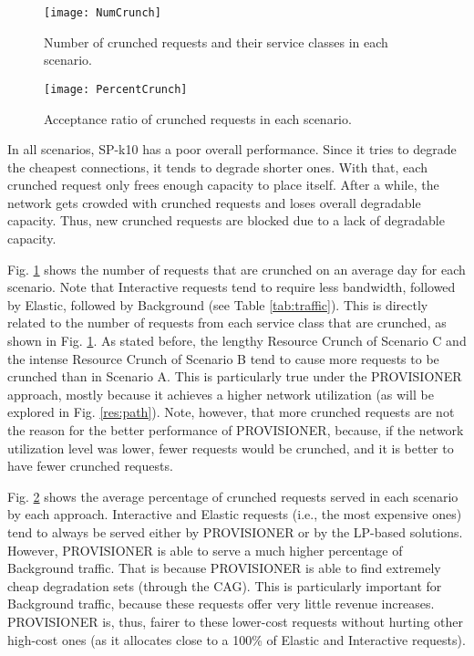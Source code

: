 \documentclass[journal]{IEEEtran}
\begin{document}
\begin{figure}[!t] 
 \centering
 \texttt{[image: NumCrunch]} 
 \caption{Number of crunched requests and their service classes in each scenario.}
 \label{res:num_crunch} 
\end{figure}

\begin{figure}[!t] 
 \centering
 \texttt{[image: PercentCrunch]} 
 \caption{Acceptance ratio of crunched requests in each scenario.}
 \label{res:percent_crunch} 
\end{figure}

In all scenarios, SP-k10 has a poor overall performance. Since it tries to degrade the cheapest connections, it tends to degrade shorter ones. With that, each crunched request only frees enough capacity to place itself. After a while, the network gets crowded with crunched requests and loses overall degradable capacity. Thus, new crunched requests are blocked due to a lack of degradable capacity.

Fig. \ref{res:num_crunch} shows the number of requests that are crunched on an average day for each scenario. Note that Interactive requests tend to require less bandwidth, followed by Elastic, followed by Background (see Table \ref{tab:traffic}). This is directly related to the number of requests from each service class that are crunched, as shown in Fig. \ref{res:num_crunch}. As stated before, the lengthy Resource Crunch of Scenario C and the intense Resource Crunch of Scenario B tend to cause more requests to be crunched than in Scenario A. This is particularly true under the PROVISIONER approach, mostly because it achieves a higher network utilization (as will be explored in Fig. \ref{res:path}). Note, however, that more crunched requests are not the reason for the better performance of PROVISIONER, because, if the network utilization level was lower, fewer requests would be crunched, and it is better to have fewer crunched requests.

Fig. \ref{res:percent_crunch} shows the average percentage of crunched requests served in each scenario by each approach. Interactive and Elastic requests (i.e., the most expensive ones) tend to always be served either by PROVISIONER or by the LP-based solutions. However, PROVISIONER is able to serve a much higher percentage of Background traffic. That is because PROVISIONER is able to find extremely cheap degradation sets (through the CAG). This is particularly important for Background traffic, because these requests offer very little revenue increases. PROVISIONER is, thus, fairer to these lower-cost requests without hurting other high-cost ones (as it allocates close to a 100\% of Elastic and Interactive requests). %
\end{document}
